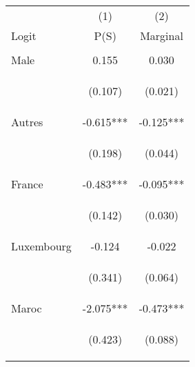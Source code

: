 \begin{center}
\begin{tabular}{lcc} \hline
 & (1) & (2) \\
Logit & P(S) & Marginal \\ \hline
\vspace{4pt} & \begin{footnotesize}\end{footnotesize} & \begin{footnotesize}\end{footnotesize} \\
Male & 0.155 & 0.030 \\
\vspace{4pt} & \begin{footnotesize}(0.107)\end{footnotesize} & \begin{footnotesize}(0.021)\end{footnotesize} \\
Autres & -0.615*** & -0.125*** \\
\vspace{4pt} & \begin{footnotesize}(0.198)\end{footnotesize} & \begin{footnotesize}(0.044)\end{footnotesize} \\
France & -0.483*** & -0.095*** \\
\vspace{4pt} & \begin{footnotesize}(0.142)\end{footnotesize} & \begin{footnotesize}(0.030)\end{footnotesize} \\
Luxembourg & -0.124 & -0.022 \\
\vspace{4pt} & \begin{footnotesize}(0.341)\end{footnotesize} & \begin{footnotesize}(0.064)\end{footnotesize} \\
Maroc & -2.075*** & -0.473*** \\
\vspace{4pt} & \begin{footnotesize}(0.423)\end{footnotesize} & \begin{footnotesize}(0.088)\end{footnotesize} \\

\end{tabular}
\end{center}
